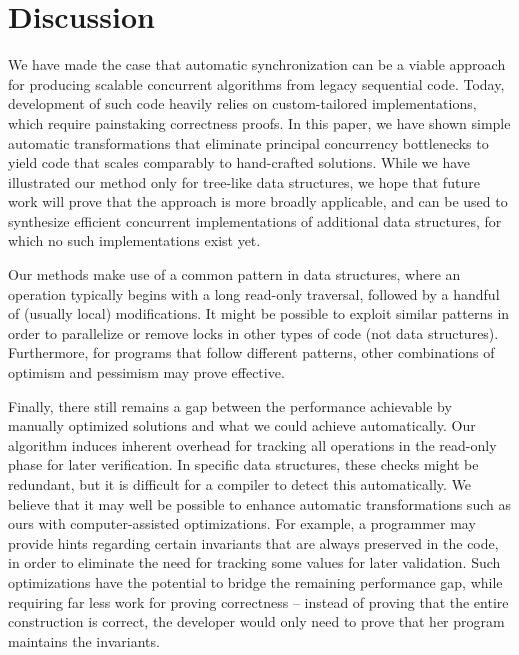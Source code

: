 \section{Discussion}\label{sec:discussion}

We have made the case that automatic synchronization can be a viable approach for producing scalable concurrent algorithms from legacy sequential code.
Today, development of such code heavily relies on custom-tailored implementations, which require painstaking correctness proofs. 
 In this paper, we have shown simple automatic transformations that eliminate principal concurrency bottlenecks  to yield code that scales comparably  to hand-crafted  solutions.
While we have illustrated our method only for tree-like data structures, we hope that future work will prove that the approach is more broadly applicable, and can be used to 
synthesize efficient concurrent implementations of additional data structures, for which no such implementations exist yet. 

Our methods make use of a common pattern in data structures, where an operation typically begins with a long read-only traversal, followed by a handful of (usually local) modifications. 
It might be possible to exploit similar patterns in order to parallelize or remove locks in other types of code (not data structures).
Furthermore, for programs that follow different patterns, other combinations of optimism and pessimism may prove effective.

Finally, there still remains a gap between the performance achievable by manually optimized solutions and what we could achieve automatically. Our algorithm induces inherent overhead for tracking all operations in the read-only phase for later verification.
In specific data structures, these checks might be redundant, but it is difficult for a compiler to detect this automatically. We believe that
it may well be possible to enhance automatic transformations such as ours with computer-assisted optimizations. For example, a programmer may provide hints regarding certain 
invariants that are always preserved in the code, in order to eliminate the need for tracking some values for later
validation. Such optimizations have the potential to bridge the remaining performance gap, while requiring far less work 
for proving correctness -- instead of proving that the entire construction is correct, the developer would only need to 
prove that her program maintains the invariants.
